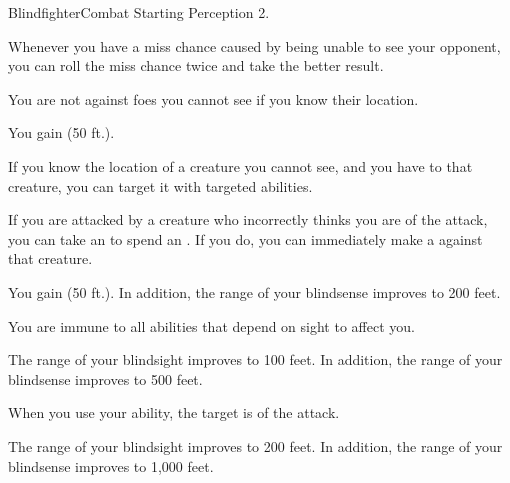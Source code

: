    \begin{feat}{Blindfighter}{Combat}
        \featpre Starting Perception 2.
        \featben
        
         Whenever you have a miss chance caused by being unable to see your opponent, you can roll the miss chance twice and take the better result.

         You are not  against foes you cannot see if you know their location.

         You gain  (50 ft.).

         If you know the location of a creature you cannot see, and you have  to that creature, you can target it with targeted abilities.

         If you are attacked by a creature who incorrectly thinks you are  of the attack, you can take an  to spend an .
        If you do, you can immediately make a  against that creature.

         You gain  (50 ft.).
        In addition, the range of your blindsense improves to 200 feet. 

         You are immune to all abilities that depend on sight to affect you.

         The range of your blindsight improves to 100 feet.
        In addition, the range of your blindsense improves to 500 feet.

         When you use your  ability, the target is  of the attack.

         The range of your blindsight improves to 200 feet.
        In addition, the range of your blindsense improves to 1,000 feet.
    \end{feat}


